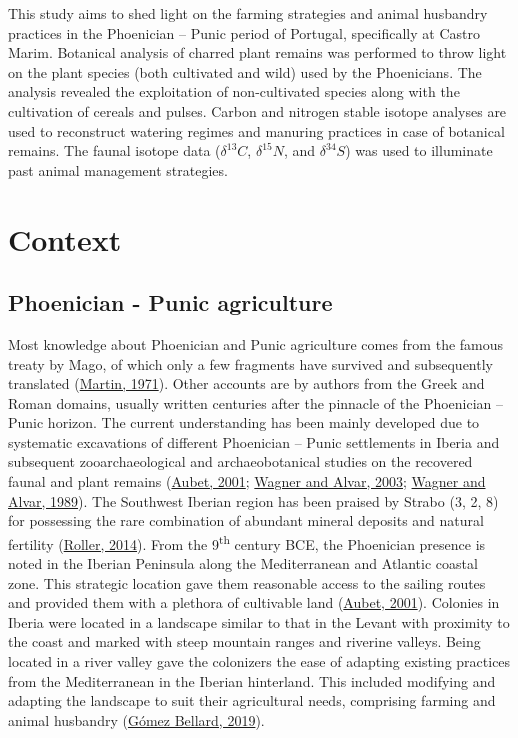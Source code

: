 \documentclass[preprint, 3p, authoryear]{elsarticle} %
\begin{document}
This study aims to shed light on the farming strategies and animal husbandry practices in the Phoenician -- Punic period of Portugal, specifically at Castro Marim. Botanical analysis of charred plant remains was performed to throw light on the plant species (both cultivated and wild) used by the Phoenicians. The analysis revealed the exploitation of non-cultivated species along with the cultivation of cereals and pulses. Carbon and nitrogen stable isotope analyses are used to reconstruct watering regimes and manuring practices in case of botanical remains. The faunal isotope data (\(\delta ^{13}C\), \(\delta ^{15}N\), and \(\delta ^{34}S\)) was used to illuminate past animal management strategies.

\hypertarget{context}{%
\section{Context}\label{context}}

\hypertarget{phoenician---punic-agriculture}{%
\subsection{Phoenician - Punic agriculture}\label{phoenician---punic-agriculture}}

Most knowledge about Phoenician and Punic agriculture comes from the famous treaty by Mago, of which only a few fragments have survived and subsequently translated (\protect\hyperlink{ref-martin71}{Martin, 1971}). Other accounts are by authors from the Greek and Roman domains, usually written centuries after the pinnacle of the Phoenician -- Punic horizon. The current understanding has been mainly developed due to systematic excavations of different Phoenician -- Punic settlements in Iberia and subsequent zooarchaeological and archaeobotanical studies on the recovered faunal and plant remains (\protect\hyperlink{ref-aubet01}{Aubet, 2001}; \protect\hyperlink{ref-wagner_alvar03}{Wagner and Alvar, 2003}; \protect\hyperlink{ref-wagner_alvar89}{Wagner and Alvar, 1989}). The Southwest Iberian region has been praised by Strabo (3, 2, 8) for possessing the rare combination of abundant mineral deposits and natural fertility (\protect\hyperlink{ref-roller14}{Roller, 2014}). From the 9\textsuperscript{th} century BCE, the Phoenician presence is noted in the Iberian Peninsula along the Mediterranean and Atlantic coastal zone. This strategic location gave them reasonable access to the sailing routes and provided them with a plethora of cultivable land (\protect\hyperlink{ref-aubet01}{Aubet, 2001}). Colonies in Iberia were located in a landscape similar to that in the Levant with proximity to the coast and marked with steep mountain ranges and riverine valleys. Being located in a river valley gave the colonizers the ease of adapting existing practices from the Mediterranean in the Iberian hinterland. This included modifying and adapting the landscape to suit their agricultural needs, comprising farming and animal husbandry (\protect\hyperlink{ref-gomezbellard19}{Gómez Bellard, 2019}).
\end{document}
